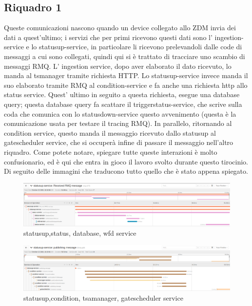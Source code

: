\documentclass[a4paper,12pt,titlepage,italian,openany]{report}
\begin{document}
\subsection{Riquadro 1}
Queste comunicazioni nascono quando un device collegato allo ZDM\cite{zdm:1} invia dei dati a quest'ultimo; i servizi che per primi ricevono questi dati
 sono l' ingestion-service e lo statusup-service, in particolare li ricevono prelevandoli dalle code di messaggi a cui sono collegati, quindi qui si è 
 trattato di tracciare uno scambio di messaggi RMQ. L' ingestion service, dopo aver elaborato il dato ricevuto, lo manda al tsmanager tramite
richiesta HTTP. Lo statusup-service invece manda il suo elaborato tramite RMQ al condition-service e fa anche una richiesta http allo status service. 
Quest' ultimo in seguito a questa richiesta, esegue una database query; questa database query fa scattare il triggerstatus-service, che scrive sulla coda che
 comunica con lo statusdown-service questo avvenimento (questa è la comunicazione usata per testare il tracing RMQ). In parallelo, ritornando al condition service, questo manda il messaggio ricevuto dallo statusup al gatescheduler service, che si occuperà infine di passare il messaggio nell'altro riquadro. Come potete notare, spiegare tutte queste interazioni è molto confusionario, ed è qui che entra in gioco il lavoro svolto durante questo tirocinio. Di seguito delle immagini che traducono tutto quello che è stato appena spiegato.
\begin{figure}[H]
    \includegraphics[scale=0.21]{49.png}
    \centering
    \caption{statusup,status, database, wfd service}
    
\end{figure}
\begin{figure}[H]
    \includegraphics[scale=0.21]{51.png}
    \centering
    \caption{statusup,condition, tsamanager, gatescheduler service}
    
\end{figure}
\end{document}
